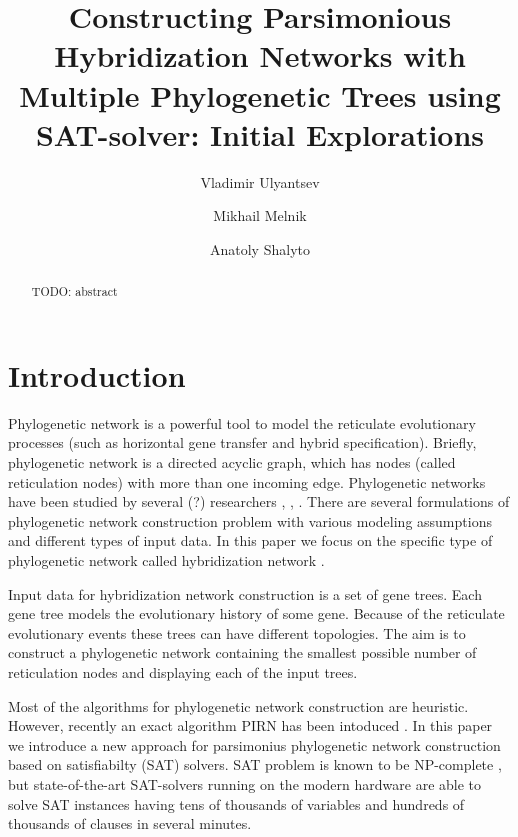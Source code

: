 \documentclass[runningheads, envcountsame, a4paper]{llncs}
\begin{document}
\mainmatter           
\title{Constructing Parsimonious Hybridization Networks with Multiple Phylogenetic Trees using SAT-solver: Initial Explorations}
\titlerunning{ } 
\toctitle{ }

\author{Vladimir Ulyantsev \and Mikhail Melnik \and Anatoly Shalyto}
%

\maketitle
\setcounter{footnote}{0}

\begin{abstract}
  TODO: abstract

\end{abstract}

\section{Introduction}

Phylogenetic network is a powerful tool to model the reticulate
evolutionary processes (such as horizontal gene transfer and hybrid specification).
Briefly, phylogenetic network is a directed acyclic graph, which has
nodes (called reticulation nodes) with more than one incoming edge. Phylogenetic
networks have been studied by several (?) researchers \cite{huson}, \cite{morrison}, 
\cite{nakhleh}. There are several formulations of phylogenetic network
construction problem with various modeling assumptions and different types of input data. 
In this paper we focus on the specific type of phylogenetic network called hybridization
network \cite{semple}.

Input data for hybridization network construction is a set of gene trees. %
Each gene tree models the evolutionary history of some gene. %
Because of the reticulate evolutionary events these trees can have different topologies.
The aim is to construct a phylogenetic network
containing the smallest possible number of reticulation nodes and displaying each of the input trees. 

Most of the algorithms for phylogenetic network construction are heuristic. However, recently
an exact algorithm PIRN has been intoduced \cite{wu}. In this paper we introduce a new approach for parsimonius
phylogenetic network construction based on satisfiabilty (SAT) solvers.
SAT problem is known to be NP-complete \cite{}, but state-of-the-art SAT-solvers running on the modern hardware 
are able to solve SAT instances having tens of thousands of variables and hundreds of thousands of clauses in several minutes.
\end{document}
